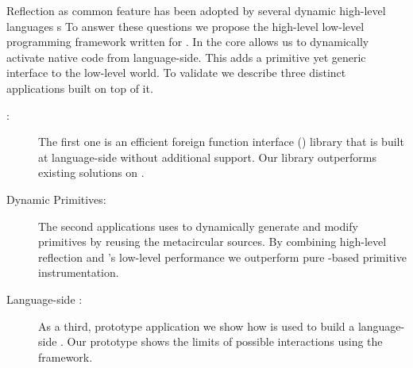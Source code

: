 \noindent Reflection as common feature has been adopted by several dynamic high-level languages s
To answer these questions we propose the high-level low-level programming framework \B written for \PH.
In the core \B allows us to dynamically activate native code from language-side.
This adds a primitive yet generic interface to the low-level \VM world.
To validate \B we describe three distinct applications built on top of it.
%
\begin{description}
	\item[\FFI:] The first one is an efficient foreign function interface (\FFI) library that is built at language-side without additional \VM support.
	Our \FFI library outperforms existing solutions on \PH.
	
	\item[Dynamic Primitives:] The second applications uses \B to dynamically generate and modify \PH primitives by reusing the metacircular \VM sources.
	By combining high-level reflection and \B's low-level performance we outperform pure \PH-based primitive instrumentation.
	
	\item[Language-side \JIT:] As a third, prototype application we show how \B is used to build a language-side \JIT.
	Our prototype shows the limits of possible \VM interactions using the \B framework. 
	
\end{description}


